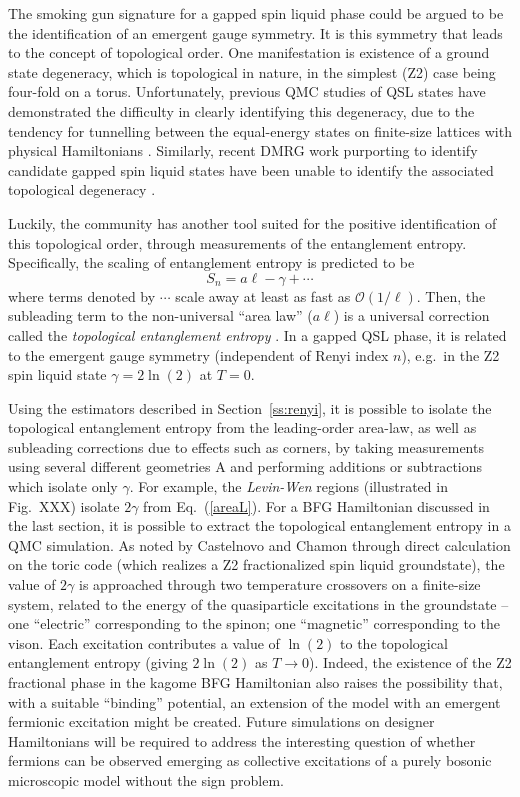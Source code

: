 \documentclass[range]{ar2e}
\begin{document}
The smoking gun signature for a gapped spin liquid phase could be argued to be the identification of an emergent gauge symmetry.  It is this symmetry that leads to the concept of topological order.  One manifestation is existence of a ground state degeneracy, which is topological in nature, in the simplest (Z2) case being four-fold on a torus.  Unfortunately, previous QMC studies of QSL states have demonstrated the difficulty in clearly identifying this degeneracy, due to the tendency for tunnelling between the equal-energy states on finite-size lattices with physical Hamiltonians \cite{Isakov1}.  Similarly, recent DMRG work purporting to identify candidate gapped spin liquid states have been unable to identify the associated topological degeneracy \cite{Yan,J1J2}.

Luckily, the community has another tool suited for the positive identification of this topological order, through measurements of the entanglement entropy.  Specifically, the scaling of entanglement entropy is predicted to be
\begin{equation}
S_n = a \ell - \gamma + \cdots \label{areaL}
\end{equation}
where terms denoted by $\cdots$ scale away at least as fast as $\mathcal{O} (1/\ell)$.  Then, the subleading term to the non-universal ``area law'' ($a \ell$) is a universal correction called the {\it topological entanglement entropy} \cite{Alioscia1,Alioscia2,LW,KP}.  In a gapped QSL phase, it is related to the emergent gauge symmetry (independent \cite{Flammia} of Renyi index $n$), e.g.~in the Z2 spin liquid state $\gamma = 2 \ln(2)$ at $T=0$.

Using the estimators described in Section~\ref{ss:renyi}, it is possible to isolate the topological entanglement entropy from the leading-order area-law, as well as subleading corrections due to effects such as corners, by taking measurements using several different geometries A and performing additions or subtractions which isolate only $\gamma$.  For example, the {\it Levin-Wen} \cite{LW} regions (illustrated in Fig.~XXX) isolate $2\gamma$ from Eq.~(\ref{areaL}).  For a BFG Hamiltonian discussed in the last section, it is possible to extract the topological entanglement entropy in a QMC simulation.  As noted by Castelnovo and Chamon \cite{castelnovo} through direct calculation on the toric code (which realizes a Z2 fractionalized spin liquid groundstate), the value of $2\gamma$ is approached through two temperature crossovers on a finite-size system, related to the energy of the quasiparticle excitations in the groundstate -- one ``electric'' corresponding to the spinon; one ``magnetic'' corresponding to the vison.  Each excitation contributes a value of $\ln(2)$ to the topological entanglement entropy (giving $2\ln(2)$ as $T \rightarrow 0$).  Indeed, the existence of the Z2 fractional phase in the kagome BFG Hamiltonian also raises the possibility that, with a suitable ``binding'' potential, an extension of the model with an emergent fermionic excitation might be created.  
Future simulations on designer Hamiltonians will be required to address the interesting question of whether fermions can be observed emerging as collective excitations of a purely bosonic microscopic model without the sign problem.
\end{document}
